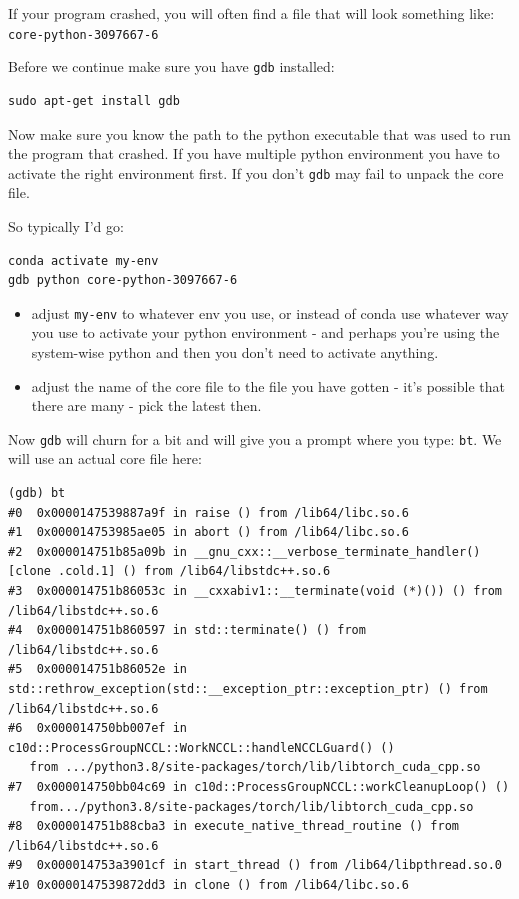 \documentclass[
]{report}
\providecommand{\tightlist}{%
  \setlength{\itemsep}{0pt}\setlength{\parskip}{0pt}}\usepackage{longtable,booktabs,array}
\begin{document}
If your program crashed, you will often find a file that will look
something like: \texttt{core-python-3097667-6}

Before we continue make sure you have \texttt{gdb} installed:

\begin{verbatim}
sudo apt-get install gdb
\end{verbatim}

Now make sure you know the path to the python executable that was used
to run the program that crashed. If you have multiple python environment
you have to activate the right environment first. If you don't
\texttt{gdb} may fail to unpack the core file.

So typically I'd go:

\begin{verbatim}
conda activate my-env
gdb python core-python-3097667-6
\end{verbatim}

\begin{itemize}
\tightlist
\item
  adjust \texttt{my-env} to whatever env you use, or instead of conda
  use whatever way you use to activate your python environment - and
  perhaps you're using the system-wise python and then you don't need to
  activate anything.
\item
  adjust the name of the core file to the file you have gotten - it's
  possible that there are many - pick the latest then.
\end{itemize}

Now \texttt{gdb} will churn for a bit and will give you a prompt where
you type: \texttt{bt}. We will use an actual core file here:

\begin{verbatim}
(gdb) bt
#0  0x0000147539887a9f in raise () from /lib64/libc.so.6
#1  0x000014753985ae05 in abort () from /lib64/libc.so.6
#2  0x000014751b85a09b in __gnu_cxx::__verbose_terminate_handler() [clone .cold.1] () from /lib64/libstdc++.so.6
#3  0x000014751b86053c in __cxxabiv1::__terminate(void (*)()) () from /lib64/libstdc++.so.6
#4  0x000014751b860597 in std::terminate() () from /lib64/libstdc++.so.6
#5  0x000014751b86052e in std::rethrow_exception(std::__exception_ptr::exception_ptr) () from /lib64/libstdc++.so.6
#6  0x000014750bb007ef in c10d::ProcessGroupNCCL::WorkNCCL::handleNCCLGuard() ()
   from .../python3.8/site-packages/torch/lib/libtorch_cuda_cpp.so
#7  0x000014750bb04c69 in c10d::ProcessGroupNCCL::workCleanupLoop() ()
   from.../python3.8/site-packages/torch/lib/libtorch_cuda_cpp.so
#8  0x000014751b88cba3 in execute_native_thread_routine () from /lib64/libstdc++.so.6
#9  0x000014753a3901cf in start_thread () from /lib64/libpthread.so.0
#10 0x0000147539872dd3 in clone () from /lib64/libc.so.6
\end{verbatim}
\end{document}
